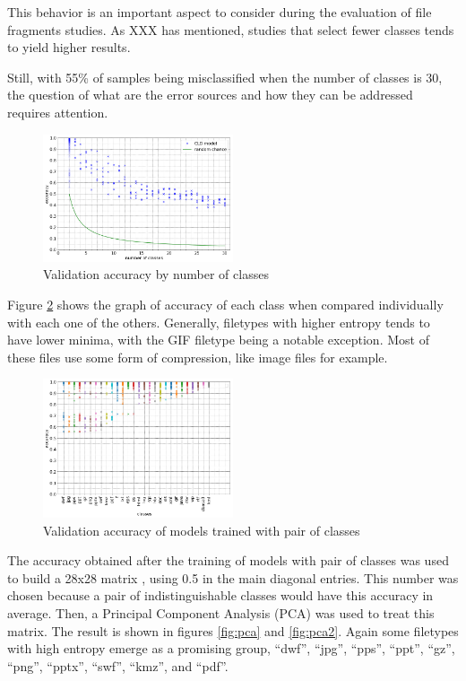 This behavior is an important aspect to consider during the evaluation of file fragments studies. As XXX 
has mentioned, studies that select fewer classes tends to yield higher results. 

Still, with 55\% of samples being misclassified when the number of classes is 30, the question of what are the error sources and how they can be addressed requires attention.

\noindent
\begin{figure}[htb!]
\centering\includegraphics[width=0.50\textwidth]{content/nclasses.png}
\caption{\label{fig:nclasses}Validation accuracy by number of classes}%
\end{figure}


Figure \ref{fig:dual} shows the graph of accuracy of each class when compared individually with each one of the others. Generally, filetypes with higher entropy tends to have lower minima, with the GIF filetype being a notable exception. Most of these files use some form of compression, like image files for example. 


\noindent
\begin{figure}[htb!]
\centering\includegraphics[width=0.50\textwidth]{content/dual.png}
\caption{\label{fig:dual}Validation accuracy of models trained with pair of classes}%
\end{figure}


The accuracy obtained after the training of models with pair of classes was used to build a 28x28 matrix , using 0.5 in the main diagonal entries. This number was chosen because a pair of indistinguishable classes would have this accuracy in average. Then, a Principal Component Analysis (PCA)  was used to treat this matrix. The result is shown in figures \ref{fig:pca} and \ref{fig:pca2}. Again some filetypes with high entropy emerge as a promising group, ``dwf'',
``jpg'',
``pps'',
``ppt'',
``gz'',
``png'',
``pptx'',
``swf'',
``kmz'',
and ``pdf''.

